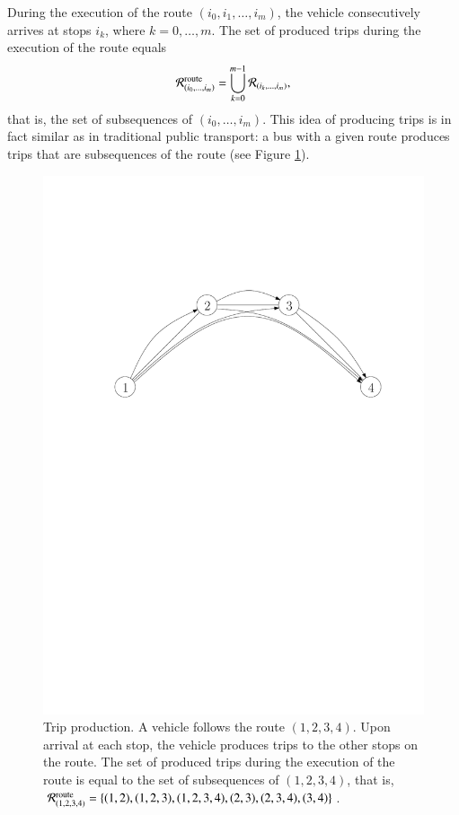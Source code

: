 \documentclass[dissertation,draft*]{aaltoseries}
\begin{document}
During the execution of the route $(i_0,i_1,\ldots,i_m)$, the vehicle consecutively arrives at stops $i_k$,
where $k=0,\ldots,m$. 
The set of produced trips during the execution of the route equals
\begin{align}
\label{routeproduction}
\mathcal{R}_{(i_0,\ldots, i_m)}^{\rm route} = \bigcup_{k =0}^{m-1} \mathcal{R}_{(i_k,\ldots, i_m)},
\end{align}
that is, the set of subsequences of $(i_0,\ldots, i_m)$. This idea of producing trips 
is in fact similar as in traditional public transport: a bus with a given route 
produces trips that are subsequences of the route (see Figure \ref{esim02}).

\begin{figure}[ht]
\begin{center}
\includegraphics[width=0.7\columnwidth]{esim02}
\caption{Trip production. A vehicle follows the route $(1,2,3,4)$. Upon arrival at each stop, the
vehicle produces trips to the other stops on the route. The
set of produced trips during the execution of the route is equal to the set of subsequences of $(1,2,3,4)$, that is, 
$\mathcal{R}_{(1,2,3,4)}^{\rm route} = \{(1,2),(1,2,3),(1,2,3,4),(2,3),(2,3,4),(3,4)\}$.
}
\label{esim02}
\end{center}
\end{figure}
\end{document}
